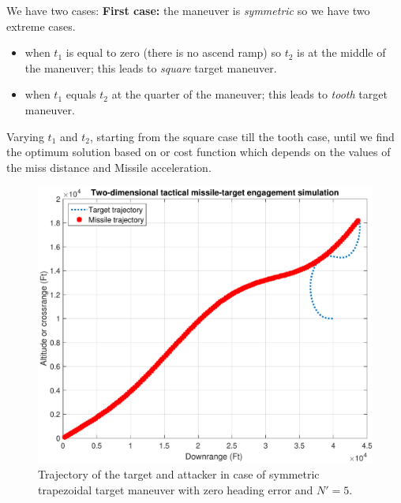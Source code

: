 We have two cases: \textbf{First case:} the maneuver is \textit{symmetric} so we have two extreme cases.
\begin{itemize}
	\item when $t_1$ is equal to zero (there is no ascend ramp)  so $t_2$ is at the middle of the maneuver; this leads to \textit{square} target maneuver.
	\item when $t_1$ equals $t_2$ at the quarter of the maneuver; this leads to \textit{tooth} target maneuver.  
\end{itemize}
Varying $t_1$ and $t_2$, starting from the square case till the tooth case, until we find the optimum solution based on or cost function which depends on the values of the miss distance and Missile acceleration. 

\begin{figure}[htb]
	\centering
	\includegraphics[scale = 0.35]{fig/trajectoryTrapSymm.pdf}
	\caption{Trajectory of the target and attacker in case of symmetric trapezoidal target maneuver with zero heading error and $N'=5$.}
	\label{trajectory trapSymm}
\end{figure}


